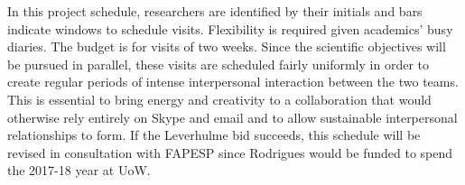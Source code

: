 \noindent In this project schedule, researchers are identified by their initials and bars indicate windows to schedule visits. Flexibility is required given academics' busy diaries.  The budget is for visits of two weeks.  Since the scientific objectives will be pursued in parallel, these visits are scheduled fairly uniformly in order to create regular periods of intense interpersonal interaction between the two teams. This is essential to bring energy and creativity to a collaboration that would otherwise rely entirely on Skype and email and to allow sustainable interpersonal relationships to form. If the Leverhulme bid succeeds, this schedule will be revised in consultation with FAPESP since Rodrigues would be funded to spend the  2017-18 year at UoW.


%
%


